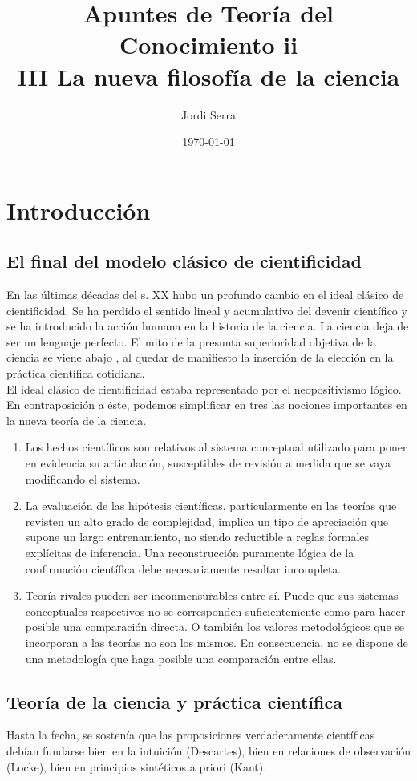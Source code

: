 \documentclass[a4paper, 11pt, twocolumn, spanish]{article}
\author{Jordi Serra}
\date{\today}
\title{Apuntes de Teoría del Conocimiento ii\\\medskip
\large III La nueva filosofía de la ciencia}
\begin{document}
\maketitle
\tableofcontents


\section{Introducción}
\label{sec:org8509c00}
\subsection{El final del modelo clásico de cientificidad}
\label{sec:orgfe6443a}
En las últimas décadas del s. XX hubo un profundo cambio en el ideal
clásico de cientificidad. Se ha perdido el sentido lineal y
acumulativo del devenir científico y se ha introducido la acción
humana en la historia de la ciencia. La ciencia deja de ser un
lenguaje perfecto. El mito de la presunta superioridad objetiva de la
ciencia se viene abajo , al quedar de manifiesto la inserción de la
elección en la práctica científica cotidiana.\\

El ideal clásico de cientificidad estaba representado por el
neopositivismo lógico. En contraposición a éste, podemos simplificar
en tres las nociones importantes en la nueva teoría de la ciencia.
\begin{enumerate}
\item Los hechos científicos son relativos al sistema conceptual
utilizado para poner en evidencia su articulación, susceptibles de revisión a medida que se vaya modificando el sistema.
\item La evaluación de las hipótesis científicas, particularmente en
las teorías que revisten un alto grado de complejidad, implica un
tipo de apreciación que supone un largo entrenamiento, no siendo
reductible a reglas formales explícitas de inferencia. Una
reconstrucción puramente lógica de la confirmación científica
debe necesariamente resultar incompleta.
\item Teoría rivales pueden ser inconmensurables entre sí. Puede que
sus sistemas conceptuales respectivos no se corresponden
suficientemente como para hacer posible una comparación
directa. O también los valores metodológicos que se incorporan a
las teorías no son los mismos. En consecuencia, no se dispone de
una metodología que haga posible una comparación entre ellas.
\end{enumerate}

\subsection{Teoría de la ciencia y práctica científica}
\label{sec:orga855db6}
Hasta la fecha, se sostenía que las proposiciones verdaderamente
científicas debían fundarse bien en la intuición (Descartes), bien en
relaciones de observación (Locke), bien en principios sintéticos a
priori (Kant).\\
\end{document}
